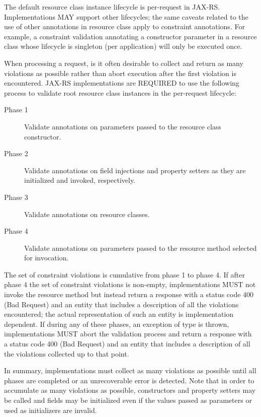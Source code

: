 The default resource class instance lifecycle is per-request in JAX-RS. Implementations MAY support other lifecycles; the same caveats related to the use of other annotations in resource class apply to constraint annotations. For example, a constraint validation annotating a constructor parameter in a resource class whose lifecycle is singleton (per application) will only be executed once.

When processing a request, is it often desirable to collect and return as many violations as possible rather than abort execution after the first violation is encountered. JAX-RS implementations are REQUIRED to use the following process to validate root resource class instances in the per-request lifecycle:

\begin{description}
\item[Phase 1] Validate annotations on parameters passed to the resource class constructor.
\item[Phase 2] Validate annotations on field injections and property setters as they are initialized and invoked, respectively.
\item[Phase 3] Validate annotations on resource classes.
\item[Phase 4] Validate annotations on parameters passed to the resource method selected for invocation.
\end{description}

The set of constraint violations is cumulative from phase 1 to phase 4. If after phase 4 the set of constraint violations is non-empty, implementations MUST not invoke the resource method but instead return a response with a status code 400 (Bad Request) and an entity that includes a description of all the violations encountered; the actual representation of such an entity is implementation dependent. If during any of these phases, an exception of type  is thrown, implementations MUST abort the validation process and return a response with a status code 400 (Bad Request) and an entity that includes a description of all the violations collected up to that point.

 In summary, implementations must collect as many violations as possible until all phases are completed or an unrecoverable error is detected. Note that in order to accumulate as many violations as possible, constructors and property setters may be called and fields may be initialized even if the values passed as parameters or used as initializers are invalid.



